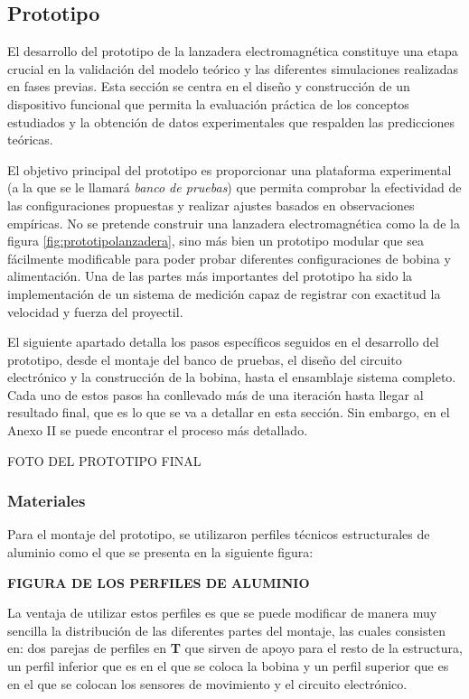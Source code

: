 \subsection{Prototipo}
\label{subsec:prototipo}

El desarrollo del prototipo de la lanzadera electromagnética constituye una etapa crucial en la validación del modelo teórico y las diferentes simulaciones realizadas en fases previas. Esta sección se centra en el diseño y construcción de un dispositivo funcional que permita la evaluación práctica de los conceptos estudiados y la obtención de datos experimentales que respalden las predicciones teóricas.

El objetivo principal del prototipo es proporcionar una plataforma experimental (a la que se le llamará \textit{banco de pruebas}) que permita comprobar la efectividad de las configuraciones propuestas y realizar ajustes basados en observaciones empíricas. No se pretende construir una lanzadera electromagnética como la de la figura \ref{fig:prototipolanzadera}, sino más bien un prototipo modular que sea fácilmente modificable para poder probar diferentes configuraciones de bobina y alimentación. Una de las partes más importantes del prototipo ha sido la implementación de un sistema de medición capaz de registrar con exactitud la velocidad y fuerza del proyectil.

El siguiente apartado detalla los pasos específicos seguidos en el desarrollo del prototipo, desde el montaje del banco de pruebas, el diseño del circuito electrónico y la construcción de la bobina, hasta el ensamblaje sistema completo. Cada uno de estos pasos ha conllevado más de una iteración hasta llegar al resultado final, que es lo que se va a detallar en esta sección. Sin embargo, en el Anexo II se puede encontrar el proceso más detallado.

FOTO DEL PROTOTIPO FINAL

\newpage

\subsubsection{Materiales}
\label{subsub:materiales}
Para el montaje del prototipo, se utilizaron perfiles técnicos estructurales de aluminio como el que se presenta en la siguiente figura:

\textbf{FIGURA DE LOS PERFILES DE ALUMINIO}

La ventaja de utilizar estos perfiles es que se puede modificar de manera muy sencilla la distribución de las diferentes partes del montaje, las cuales consisten en: dos parejas de perfiles en \textbf{T} que sirven de apoyo para el resto de la estructura, un perfil inferior que es en el que se coloca la bobina y un perfil superior que es en el que se colocan los sensores de movimiento y el circuito electrónico.

